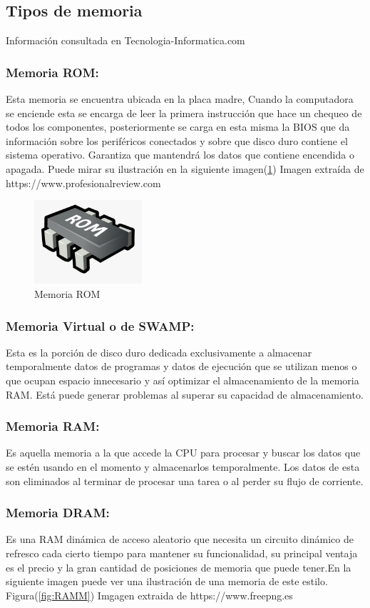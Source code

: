 \documentclass{article}
\begin{document}
\subsection{Tipos de memoria}
Información consultada en    Tecnologia-Informatica.com\cite{TecnologiaInformatica}
\subsubsection{Memoria ROM:}
Esta memoria se encuentra ubicada en la placa madre, Cuando la computadora se enciende esta se encarga de leer la primera instrucción que hace un chequeo de todos los componentes, posteriormente se carga en esta misma la BIOS que da información sobre los periféricos conectados y sobre que disco duro contiene el sistema operativo. Garantiza que mantendrá los datos que contiene encendida o apagada.
Puede mirar su ilustración en la siguiente imagen(\ref{fig:ROM}) Imagen  extraída de https://www.profesionalreview.com

\begin{figure}[h]
\includegraphics[width=4cm]{ROM.png}
\centering
\caption{Memoria ROM}
\label{fig:ROM}
\end{figure}
\subsubsection{Memoria Virtual o de SWAMP:}
Esta es la porción de disco duro dedicada exclusivamente a almacenar temporalmente datos de programas y datos de ejecución que se utilizan menos o que ocupan espacio innecesario y así optimizar el almacenamiento de la memoria RAM. Está puede generar problemas al superar su capacidad de almacenamiento.
\subsubsection{Memoria RAM:}
Es aquella memoria a la que accede la CPU para procesar y buscar los datos que se estén usando en el momento y almacenarlos temporalmente. Los datos de esta son eliminados al terminar de procesar una tarea o al perder su flujo de corriente.
\subsubsection{Memoria DRAM:}
Es una RAM dinámica de acceso aleatorio que necesita un circuito dinámico de refresco cada cierto tiempo para mantener su funcionalidad, su principal ventaja es el precio y la gran cantidad de posiciones de memoria que puede tener.En la siguiente imagen puede ver una ilustración de una memoria de este estilo. Figura(\ref{fig:RAMM}) Imgagen extraida de https://www.freepng.es
\end{document}
